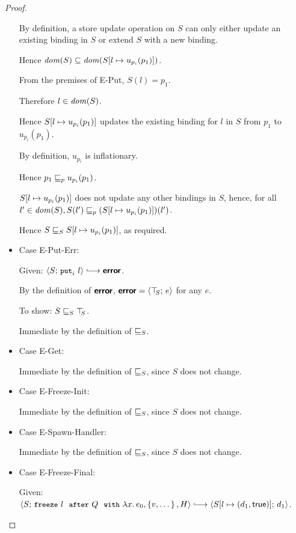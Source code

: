 \begin{proof}
\begin{itemize}
    By definition, a store update operation on $S$ can only either
    update an existing binding in $S$ or extend $S$ with a new
    binding.

    Hence $\mathit{dom}(S) \subseteq \mathit{dom}(S[l \mapsto u_{p_i}(p_1)])$.

    From the premises of {\sc E-Put}, $S(l) = p_1$.

    Therefore $l \in \mathit{dom}(S)$.

    Hence $S[l \mapsto u_{p_i}(p_1)]$ updates the existing
    binding for $l$ in $S$ from $p_1$ to $u_{p_i}(p_1)$.

    By definition, $u_{p_i}$ is inflationary.

    Hence $p_1 \sqsubseteq_p u_{p_i}(p_1)$.

    $S[l \mapsto u_{p_i}(p_1)]$ does not update any other
    bindings in $S$, hence, for all $l' \in \mathit{dom}(S), S(l') \sqsubseteq_p
    (S[l \mapsto u_{p_i}(p_1)])(l')$.

    Hence $S \sqsubseteq_S S[l \mapsto u_{p_i}(p_1)]$, as required.

  \item Case {\sc E-Put-Err}:

    Given: $\config{S}{\putiexp{l}} \parstepsto \error$.

    By the definition of $\textbf{\textsf{error}}$, $\textbf{\textsf{error}} = \langle \top\hspace{-0.85mm}_{S};\, e \rangle$ for
    any $e$.

    To show: $S \sqsubseteq_S \top\hspace{-0.85mm}_{S}$.

    Immediate by the definition of $ \sqsubseteq_S $.

  \item Case {\sc E-Get}:

    Immediate by the definition of $ \sqsubseteq_S $, since $S$ does
    not change.

  \item Case {\sc E-Freeze-Init}:

    Immediate by the definition of $ \sqsubseteq_S $, since $S$ does
    not change.

  \item Case {\sc E-Spawn-Handler}:

    Immediate by the definition of $ \sqsubseteq_S $, since $S$ does
    not change.

  \item Case {\sc E-Freeze-Final}:

    Given:
    $\config{S}{\freezeafterfull{l}{Q}{\lam{x}{e_0}}{\setof{v,
          \dots}}{H}} \parstepsto
    \config{\extS{S}{l}{d_1}{\frozentrue}}{d_1}$.


\end{itemize}
\end{proof}
